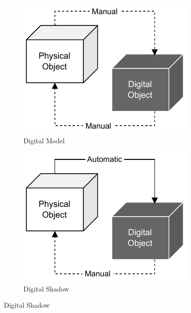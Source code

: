 \begin{figure}[t]
    \centering
    \begin{subfigure}[b]{0.3\linewidth}
        \centering
        \includegraphics[width=\linewidth]{figures/kritzinger-digital-model.pdf}
        \caption{Digital Model}
        \label{fig:dt-taxonomy-digital-model}
    \end{subfigure}
    \hfill
    \begin{subfigure}[b]{0.3\linewidth}
        \centering
        \includegraphics[width=\linewidth]{figures/kritzinger-digital-shadow.pdf}
        \caption{Digital Shadow}
        \label{fig:dt-taxonomy-digital-shadow}

\end{subfigure}
\end{figure}
